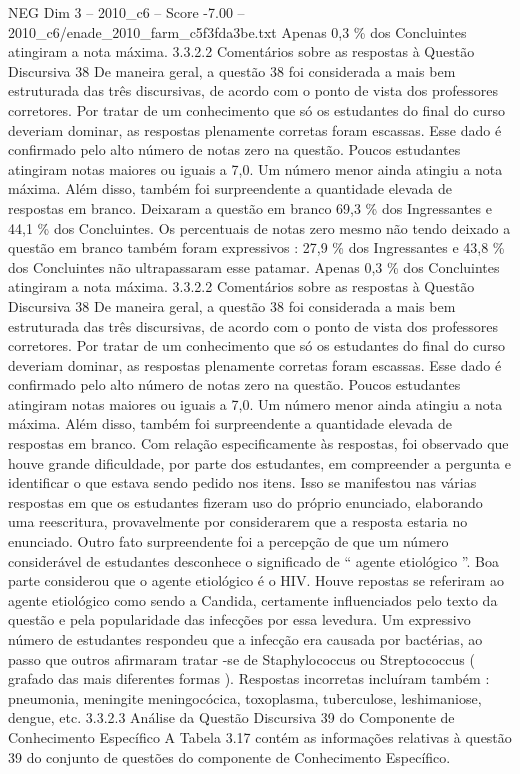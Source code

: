 \begin{textsample}{NEG Dim 3 – 2010\_c6 – Score -7.00 – 2010\_c6/enade\_2010\_farm\_c5f3fda3be.txt}
Apenas 0,3 \% dos Concluintes atingiram a nota máxima. 3.3.2.2 Comentários sobre as respostas à Questão Discursiva 38 De maneira geral, a questão 38 foi considerada a mais bem estruturada das três discursivas, de acordo com o ponto de vista dos professores corretores.
Por tratar de um conhecimento que só os estudantes do final do curso deveriam dominar, as respostas plenamente corretas foram escassas.
Esse dado é confirmado pelo alto número de notas zero na questão.
Poucos estudantes atingiram notas maiores ou iguais a 7,0.
Um número menor ainda atingiu a nota máxima.
Além disso, também foi surpreendente a quantidade elevada de respostas em branco.
Deixaram a questão em branco 69,3 \% dos Ingressantes e 44,1 \% dos Concluintes.
Os percentuais de notas zero mesmo não tendo deixado a questão em branco também foram expressivos : 27,9 \% dos Ingressantes e 43,8 \% dos Concluintes não ultrapassaram esse patamar.
Apenas 0,3 \% dos Concluintes atingiram a nota máxima. 3.3.2.2 Comentários sobre as respostas à Questão Discursiva 38 De maneira geral, a questão 38 foi considerada a mais bem estruturada das três discursivas, de acordo com o ponto de vista dos professores corretores.
Por tratar de um conhecimento que só os estudantes do final do curso deveriam dominar, as respostas plenamente corretas foram escassas.
Esse dado é confirmado pelo alto número de notas zero na questão.
Poucos estudantes atingiram notas maiores ou iguais a 7,0.
Um número menor ainda atingiu a nota máxima.
Além disso, também foi surpreendente a quantidade elevada de respostas em branco.
Com relação especificamente às respostas, foi observado que houve grande dificuldade, por parte dos estudantes, em compreender a pergunta e identificar o que estava sendo pedido nos itens.
Isso se manifestou nas várias respostas em que os estudantes fizeram uso do próprio enunciado, elaborando uma reescritura, provavelmente por considerarem que a resposta estaria no enunciado.
Outro fato surpreendente foi a percepção de que um número considerável de estudantes desconhece o significado de “ agente etiológico ”.
Boa parte considerou que o agente etiológico é o HIV.
Houve repostas se referiram ao agente etiológico como sendo a Candida, certamente influenciados pelo texto da questão e pela popularidade das infecções por essa levedura.
Um expressivo número de estudantes respondeu que a infecção era causada por bactérias, ao passo que outros afirmaram tratar -se de Staphylococcus ou Streptococcus ( grafado das mais diferentes formas ).
Respostas incorretas incluíram também : pneumonia, meningite meningocócica, toxoplasma, tuberculose, leshimaniose, dengue, etc. 3.3.2.3 Análise da Questão Discursiva 39 do Componente de Conhecimento Específico A Tabela 3.17 contém as informações relativas à questão 39 do conjunto de questões do componente de Conhecimento Específico.

\end{textsample}
